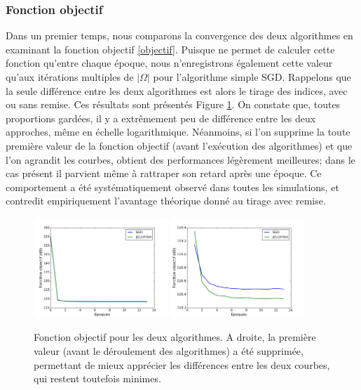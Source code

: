 \documentclass[10pt,a4paper]{article}
\begin{document}
\subsubsection*{Fonction objectif}
Dans un premier temps, nous comparons la convergence des deux algorithmes en examinant la fonction objectif \eqref{objectif}. Puisque \jel ne permet de calculer cette fonction qu'entre chaque époque, nous n'enregistrons également cette valeur qu'aux itérations multiples de $|\Omega|$ pour l'algorithme simple SGD. Rappelons que la seule différence entre les deux algorithmes est alors le tirage des indices, avec ou sans remise. Ces résultats sont présentés Figure \ref{obj_samp}. On constate que, toutes proportions gardées, il y a extrêmement peu de différence entre les deux approches, même en échelle logarithmique. Néanmoins, si l'on supprime la toute première valeur de la fonction objectif (avant l'exécution des algorithmes) et que l'on agrandit les courbes, \jel obtient des performances légèrement meilleures; dans le cas présent il parvient même à rattraper son retard après une époque. Ce comportement a été systématiquement observé dans toutes les simulations, et contredit empiriquement l'avantage théorique donné au tirage avec remise.

\begin{figure}
\centering
\includegraphics[width=0.45\textwidth]{fig/obj_samp1}
\includegraphics[width=0.45\textwidth]{fig/obj_samp2}
\caption{Fonction objectif pour les deux algorithmes. A droite, la première valeur (avant le déroulement des algorithmes) a été supprimée, permettant de mieux apprécier les différences entre les deux courbes, qui restent toutefois minimes.}
\label{obj_samp}
\end{figure}
\end{document}
